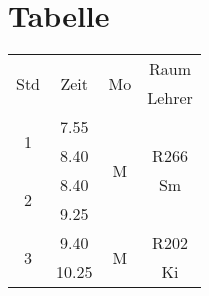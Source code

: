 \section{Tabelle}

\begin{table}[ht]
\begin{tabular}{|cc||cc|}
\hline

\multirow{2}{*}{Std} 	& \multirow{2}{*}{Zeit} & 	\multirow{2}{*}{Mo} & Raum 	\\
    					&      					&    					& Lehrer\\
\hline \hline
\multirow{2}{*}{1} 		& 	7.55  				& \multirow{4}{*}{M} 	&		\\
						&	8.40  				&  						& R266	\\
\cline{1-2}
\multirow{2}{*}{2} 		& 	8.40  				&   					& Sm	\\
						&	9.25  				&   					& 		\\
\cline{1-4}
\multirow{2}{*}{3} 		& 	9.40  				& \multirow{2}{*}{M} 	& R202	\\
  						&  10.25  				&						& Ki	\\

\end{tabular}
\end{table}